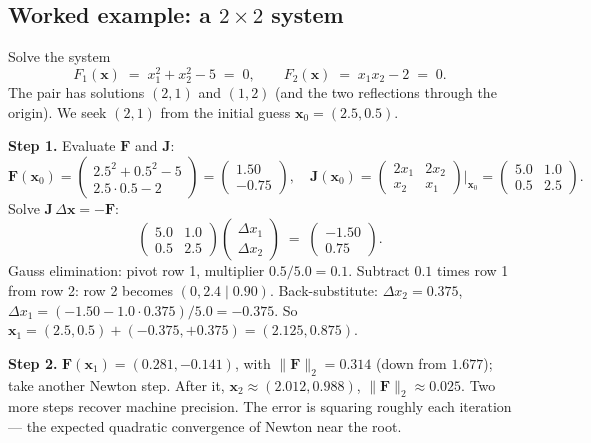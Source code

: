 \documentclass[11pt,a4paper]{article}
\newcommand{\xv}{\mathbf{x}}
\newcommand{\Fv}{\mathbf{F}}
\newcommand{\Jac}{\mathbf{J}}
\begin{document}
\subsection{Worked example: a $2\times 2$ system}

\begin{example}
Solve the system
\[
   F_1(\xv) \;=\; x_1^2 + x_2^2 - 5 \;=\; 0,
   \qquad
   F_2(\xv) \;=\; x_1 x_2 - 2 \;=\; 0.
\]
The pair has solutions $(2,1)$ and $(1,2)$ (and the two reflections
through the origin).  We seek $(2,1)$ from the initial guess
$\xv_0 = (2.5, 0.5)$.

\textbf{Step 1.}  Evaluate $\Fv$ and $\Jac$:
\[
   \Fv(\xv_0) = \begin{pmatrix} 2.5^2 + 0.5^2 - 5 \\ 2.5 \cdot 0.5 - 2\end{pmatrix}
              = \begin{pmatrix} 1.50 \\ -0.75 \end{pmatrix},
   \quad
   \Jac(\xv_0) = \begin{pmatrix} 2 x_1 & 2 x_2 \\ x_2 & x_1 \end{pmatrix}\!\bigg|_{\xv_0}
              = \begin{pmatrix} 5.0 & 1.0 \\ 0.5 & 2.5 \end{pmatrix}.
\]
Solve $\Jac \, \Delta\xv = -\Fv$:
\[
   \begin{pmatrix} 5.0 & 1.0 \\ 0.5 & 2.5 \end{pmatrix}
   \begin{pmatrix} \Delta x_1 \\ \Delta x_2 \end{pmatrix}
   \;=\; \begin{pmatrix} -1.50 \\ 0.75 \end{pmatrix}.
\]
Gauss elimination: pivot row 1, multiplier $0.5/5.0 = 0.1$.  Subtract
$0.1$ times row 1 from row 2: row 2 becomes
$(0, 2.4 \mid 0.90)$.  Back-substitute:
$\Delta x_2 = 0.375$,
$\Delta x_1 = (-1.50 - 1.0\cdot 0.375)/5.0 = -0.375$.
So $\xv_1 = (2.5, 0.5) + (-0.375, +0.375) = (2.125, 0.875)$.

\textbf{Step 2.}  $\Fv(\xv_1) = (0.281, -0.141)$, with
$\|\Fv\|_2 = 0.314$ (down from $1.677$); take another Newton step.
After it, $\xv_2 \approx (2.012, 0.988)$, $\|\Fv\|_2 \approx 0.025$.
Two more steps recover machine precision.  The error is squaring
roughly each iteration --- the expected quadratic convergence of
Newton near the root.
\end{example}
\end{document}
